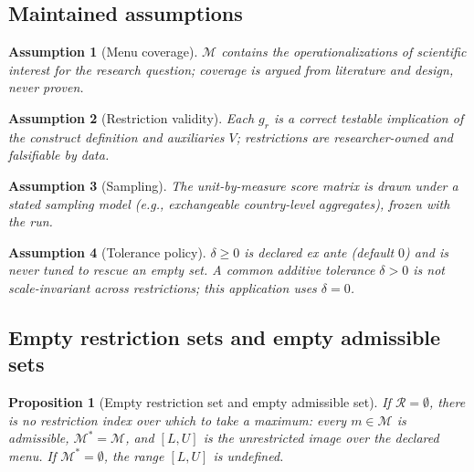 \documentclass[10pt,letterpaper]{article}
\newtheorem{proposition}{Proposition}[section]
\newtheorem{assumption}{Assumption}[section]
\newcommand{\M}{\ensuremath{\mathcal{M}}}
\newcommand{\Rset}{\mathcal{R}}
\begin{document}
\subsection{Maintained assumptions}
\begin{assumption}[Menu coverage]
$\M$ contains the operationalizations of scientific interest for the research question; coverage is argued from literature and design, never proven.
\end{assumption}
\begin{assumption}[Restriction validity]
Each $g_r$ is a correct testable implication of the construct definition and auxiliaries $V$; restrictions are researcher-owned and falsifiable by data.
\end{assumption}
\begin{assumption}[Sampling]
The unit-by-measure score matrix is drawn under a stated sampling model (e.g., exchangeable country-level aggregates), frozen with the run.
\end{assumption}
\begin{assumption}[Tolerance policy]
$\delta\ge 0$ is declared ex ante (default $0$) and is never tuned to rescue an empty set.
A common additive tolerance $\delta>0$ is not scale-invariant across restrictions; this application uses $\delta=0$.
\end{assumption}

\subsection{Empty restriction sets and empty admissible sets}
\begin{proposition}[Empty restriction set and empty admissible set]
\label{prop:empty}
If $\Rset=\emptyset$, there is no restriction index over which to take a maximum: every $m\in\M$ is admissible, $\M^*=\M$, and $[L,U]$ is the unrestricted image over the declared menu.
If $\M^*=\emptyset$, the range $[L,U]$ is undefined.
\end{proposition}
\end{document}
